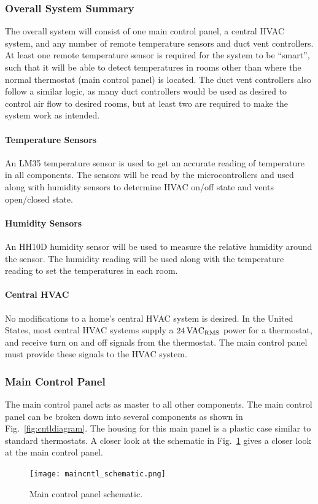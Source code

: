 \subsubsection{Overall System Summary}
The overall system will consist of one main control panel, a central HVAC system, and any number of remote temperature sensors and duct vent controllers.  At least one remote temperature sensor is required for the system to be ``smart'', such that it will be able to detect temperatures in rooms other than where the normal thermostat (main control panel) is located.  The duct vent controllers also follow a similar logic, as many duct controllers would be used as desired to control air flow to desired rooms, but at least two are required to make the system work as intended.
\paragraph{Temperature Sensors}
\label{Temp Sensors}
An LM35 temperature sensor is used to get an accurate reading of temperature in all components. The sensors will be read by the microcontrollers and used along with humidity sensors to determine HVAC on/off state and vents open/closed state.
\paragraph{Humidity Sensors}
\label{humid_sensors}
An HH10D humidity sensor will be used to measure the relative humidity around the sensor.  The humidity reading will be used along with the temperature reading to set the temperatures in each room.

\paragraph{Central HVAC}
No modifications to a home's central HVAC system is desired.  In the United States, most central HVAC systems supply a $24\, \rm VAC_{RMS}$ power for a thermostat, and receive turn on and off signals from the thermostat.  The main control panel must provide these signals to the HVAC system.

\subsubsection{Main Control Panel}
The main control panel acts as master to all other components. The main control panel can be broken down into several components as shown in Fig.~\ref{fig:cntldiagram}. The housing for this main panel is a plastic case similar to standard thermostats. A closer look at the schematic in Fig.~\ref{fig:maincntl_schematic} gives a closer look at the main control panel.
\begin{figure}
\centering
\texttt{[image: maincntl\_schematic.png]}
\caption{Main control panel schematic.}
\label{fig:maincntl_schematic}
\end{figure}
